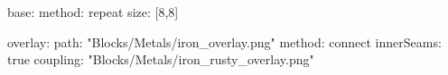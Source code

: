 base:
  method: repeat
  size: [8,8]

overlay:
  path: "Blocks/Metals/iron_overlay.png"
  method: connect
  innerSeams: true
  coupling: "Blocks/Metals/iron_rusty_overlay.png"